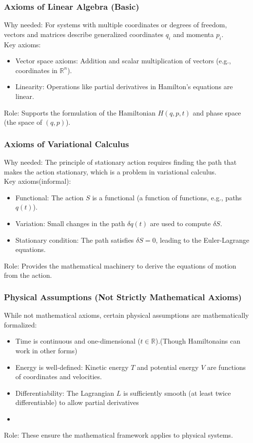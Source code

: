 \subsubsection{Axioms of Linear Algebra (Basic)}
Why needed: For systems with multiple coordinates or degrees of freedom, vectors and matrices describe generalized coordinates $ q_i $ and momenta $ p_i $.
\\
Key axioms:
\begin{itemize}
    \item Vector space axioms: Addition and scalar multiplication of vectors (e.g., coordinates in $ \mathbb{R}^n $).
    \item Linearity: Operations like partial derivatives in Hamilton’s equations are linear.


\end{itemize}
Role: Supports the formulation of the Hamiltonian $ H(q, p, t) $ and phase space (the space of $ (q, p) $).

\subsubsection{Axioms of Variational Calculus}
Why needed: The principle of stationary action requires finding the path that makes the action stationary, which is a problem in variational calculus.
\\
Key axioms(informal):
\begin{itemize}
    \item Functional: The action $ S $ is a functional (a function of functions, e.g., paths $ q(t) $).
    \item Variation: Small changes in the path $ \delta q(t) $ are used to compute $ \delta S $.
    \item Stationary condition: The path satisfies $ \delta S = 0 $, leading to the Euler-Lagrange equations.

\end{itemize}

Role: Provides the mathematical machinery to derive the equations of motion from the action.

\subsubsection{Physical Assumptions (Not Strictly Mathematical Axioms)}
While not mathematical axioms, certain physical assumptions are mathematically formalized:
\begin{itemize}
    \item Time is continuous and one-dimensional ($ t \in \mathbb{R} $).(Though Hamiltonains can work in other forms)
    \item Energy is well-defined: Kinetic energy $ T $ and potential energy $ V $ are functions of coordinates and velocities.
    \item Differentiability: The Lagrangian $ L $ is sufficiently smooth (at least twice differentiable) to allow partial derivatives
    \item 

\end{itemize}
Role: These ensure the mathematical framework applies to physical systems.
